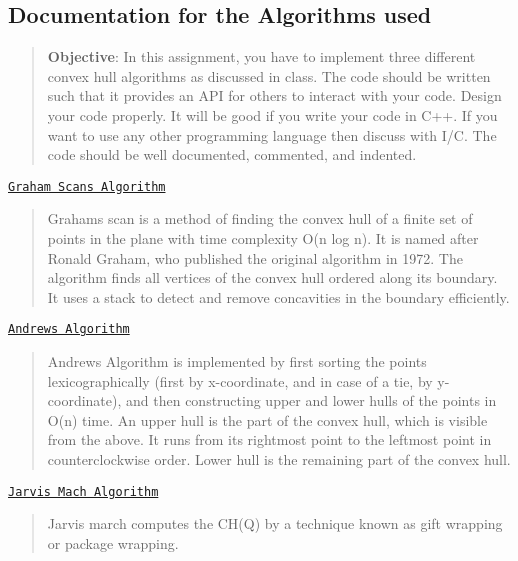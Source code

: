 \subsection*{Documentation for the Algorithms used }

\begin{quote}
{\bfseries Objective}\+: In this assignment, you have to implement three different convex hull algorithms as discussed in class. The code should be written such that it provides an A\+PI for others to interact with your code. Design your code properly. It will be good if you write your code in C++. If you want to use any other programming language then discuss with I/C. The code should be well documented, commented, and indented. \end{quote}



\begin{DoxyEnumerate}
\item \href{https://en.wikipedia.org/wiki/Graham_scan}{\tt Graham Scans Algorithm} \begin{quote}
Graham\textquotesingle{}s scan is a method of finding the convex hull of a finite set of points in the plane with time complexity O(n log n). It is named after Ronald Graham, who published the original algorithm in 1972. The algorithm finds all vertices of the convex hull ordered along its boundary. It uses a stack to detect and remove concavities in the boundary efficiently. \end{quote}

\item \href{http://nms.csail.mit.edu/~aklmiu/6.838/convexhull/}{\tt Andrews Algorithm} \begin{quote}
Andrew\textquotesingle{}s Algorithm is implemented by first sorting the points lexicographically (first by x-\/coordinate, and in case of a tie, by y-\/coordinate), and then constructing upper and lower hulls of the points in O(n) time. An upper hull is the part of the convex hull, which is visible from the above. It runs from its rightmost point to the leftmost point in counterclockwise order. Lower hull is the remaining part of the convex hull. \end{quote}

\item \href{http://www.personal.kent.edu/~rmuhamma/Compgeometry/MyCG/ConvexHull/jarvisMarch.htm}{\tt Jarvis Mach Algorithm} \begin{quote}
Jarvis march computes the C\+H(\+Q) by a technique known as gift wrapping or package wrapping.\end{quote}

\end{DoxyEnumerate}